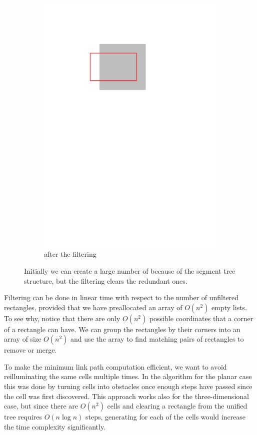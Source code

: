 \documentclass[english,gradu]{tktltiki2018}
\begin{document}
\begin{figure}
\begin{subfigure}[t]{0.3\textwidth}
		\includegraphics[width=\textwidth,page=3]{fig/filter}
		\caption{\addEs after the filtering}
	\end{subfigure}
	\caption{Initially we can create a large number of \addEs because of the segment tree structure, but the filtering clears the redundant ones.}\label{fig:filter}
\end{figure}

Filtering can be done in linear time with respect to the number of unfiltered rectangles, provided that we have preallocated an array of $O(n^2)$ empty lists.
To see why, notice that there are only $O(n^2)$ possible coordinates that a corner of a rectangle can have.
We can group the rectangles by their corners into an array of size $O(n^2)$ and use the array to find matching pairs of rectangles to remove or merge.

To make the minimum link path computation efficient, we want to avoid reilluminating the same cells multiple times.
In the algorithm for the planar case this was done by turning cells into obstacles once enough steps have passed since the cell was first discovered.
This approach works also for the three-dimensional case, but since there are $O(n^2)$ cells and clearing a rectangle from the unified tree requires $O(n\log n)$ steps, generating \obsEs for each of the cells would increase the time complexity significantly.
\end{document}
